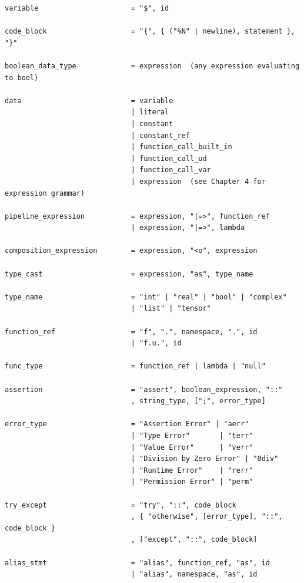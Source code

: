 \begin{verbatim}
variable                      = "$", id

code_block                    = "{", { ("%N" | newline), statement }, "}"

boolean_data_type             = expression  (any expression evaluating to bool)

data                          = variable
                              | literal
                              | constant
                              | constant_ref
                              | function_call_built_in
                              | function_call_ud
                              | function_call_var
                              | expression  (see Chapter 4 for expression grammar)

pipeline_expression           = expression, "|=>", function_ref
                              | expression, "|=>", lambda

composition_expression        = expression, "<o", expression

type_cast                     = expression, "as", type_name

type_name                     = "int" | "real" | "bool" | "complex"
                              | "list" | "tensor"

function_ref                  = "f", ".", namespace, ".", id
                              | "f.u.", id

func_type                     = function_ref | lambda | "null"

assertion                     = "assert", boolean_expression, "::"
                              , string_type, [";", error_type]

error_type                    = "Assertion Error" | "aerr"
                              | "Type Error"       | "terr"
                              | "Value Error"      | "verr"
                              | "Division by Zero Error" | "0div"
                              | "Runtime Error"    | "rerr"
                              | "Permission Error" | "perm"

try_except                    = "try", "::", code_block
                              , { "otherwise", [error_type], "::", code_block }
                              , ["except", "::", code_block]

alias_stmt                    = "alias", function_ref, "as", id
                              | "alias", namespace, "as", id
\end{verbatim}

\newpage
